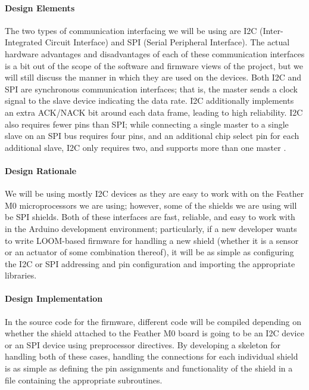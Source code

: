 \documentclass[onecolumn, draftclsnofoot,10pt, compsoc]{IEEEtran}
\begin{document}
\paragraph{Design Elements}
The two types of communication interfacing we will be using are I2C (Inter-Integrated Circuit Interface) and SPI (Serial Peripheral Interface).  The actual hardware advantages and disadvantages of each of these communication interfaces is a bit out of the scope of the software and firmware views of the project, but we will still discuss the manner in which they are used on the devices. Both I2C and SPI are synchronous communication interfaces; that is, the master sends a clock signal to the slave device indicating the data rate. I2C additionally implements an extra ACK/NACK bit around each data frame, leading to high reliability. I2C also requires fewer pins than SPI; while connecting a single master to a single slave on an SPI bus requires four pins, and an additional chip select pin for each additional slave, I2C only requires two, and supports more than one master \cite{I2C} \cite{SPI}.

\paragraph{Design Rationale}
We will be using mostly I2C devices as they are easy to work with on the Feather M0 microprocessors we are using; however, some of the shields we are using will be SPI shields. Both of these interfaces are fast, reliable, and easy to work with in the Arduino development environment; particularly, if a new developer wants to write LOOM-based firmware for handling a new shield (whether it is a sensor or an actuator of some combination thereof), it will be as simple as configuring the I2C or SPI addressing and pin configuration and importing the appropriate libraries.

\paragraph{Design Implementation}
In the source code for the firmware, different code will be compiled depending on whether the shield attached to the Feather M0 board is going to be an I2C device or an SPI device using preprocessor directives. By developing a skeleton for handling both of these cases, handling the connections for each individual shield is as simple as defining the pin assignments and functionality of the shield in a file containing the appropriate subroutines.
\end{document}
